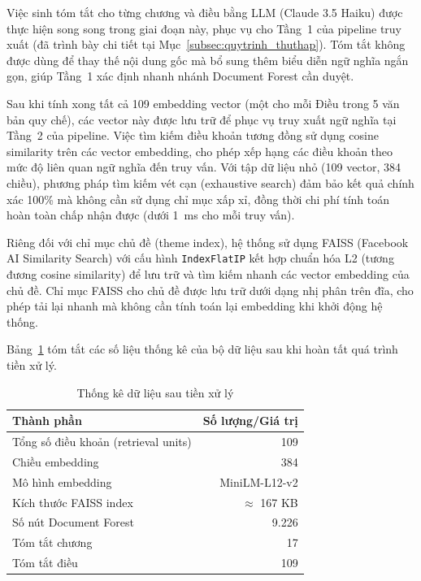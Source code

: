 Việc sinh tóm tắt cho từng chương và điều bằng LLM (Claude 3.5 Haiku) được thực
hiện song song trong giai đoạn này, phục vụ cho Tầng~1 của pipeline truy xuất
(đã trình bày chi tiết tại Mục~\ref{subsec:quytrinh_thuthap}). Tóm tắt không
được dùng để thay thế nội dung gốc mà bổ sung thêm biểu diễn ngữ nghĩa ngắn
gọn, giúp Tầng~1 xác định nhanh nhánh Document Forest cần duyệt.

Sau khi tính xong tất cả 109 embedding vector (một cho mỗi Điều trong 5 văn bản
quy chế), các vector này được lưu trữ để phục vụ truy xuất ngữ nghĩa tại
Tầng~2 của pipeline. Việc tìm kiếm điều khoản tương đồng sử dụng cosine
similarity trên các vector embedding, cho phép xếp hạng các điều khoản theo
mức độ liên quan ngữ nghĩa đến truy vấn. Với tập dữ liệu nhỏ (109 vector,
384 chiều), phương pháp tìm kiếm vét cạn (exhaustive search) đảm bảo kết quả
chính xác 100\% mà không cần sử dụng chỉ mục xấp xỉ, đồng thời chi phí tính
toán hoàn toàn chấp nhận được (dưới 1~ms cho mỗi truy vấn).

Riêng đối với chỉ mục chủ đề (theme index), hệ thống sử dụng FAISS (Facebook
AI Similarity Search) với cấu hình \texttt{IndexFlatIP} kết hợp chuẩn hóa L2
(tương đương cosine similarity) để lưu trữ và tìm kiếm nhanh các vector embedding
của chủ đề. Chỉ mục FAISS cho chủ đề được lưu trữ dưới dạng nhị phân trên đĩa,
cho phép tải lại nhanh mà không cần tính toán lại embedding khi khởi động hệ thống.

Bảng~\ref{tab:thongke_tienxuly} tóm tắt các số liệu thống kê của bộ dữ liệu
sau khi hoàn tất quá trình tiền xử lý.

\begin{table}[htbp]
    \centering
    \caption{Thống kê dữ liệu sau tiền xử lý}
    \label{tab:thongke_tienxuly}
    \begin{tabular}{lr}
        \toprule
        \textbf{Thành phần} & \textbf{Số lượng/Giá trị} \\
        \midrule
        Tổng số điều khoản (retrieval units) & 109 \\
        Chiều embedding & 384 \\
        Mô hình embedding & MiniLM-L12-v2 \\
        Kích thước FAISS index & $\approx$ 167 KB \\
        Số nút Document Forest & 9.226 \\
        Tóm tắt chương & 17 \\
        Tóm tắt điều & 109 \\
        \bottomrule
    \end{tabular}
\end{table}

